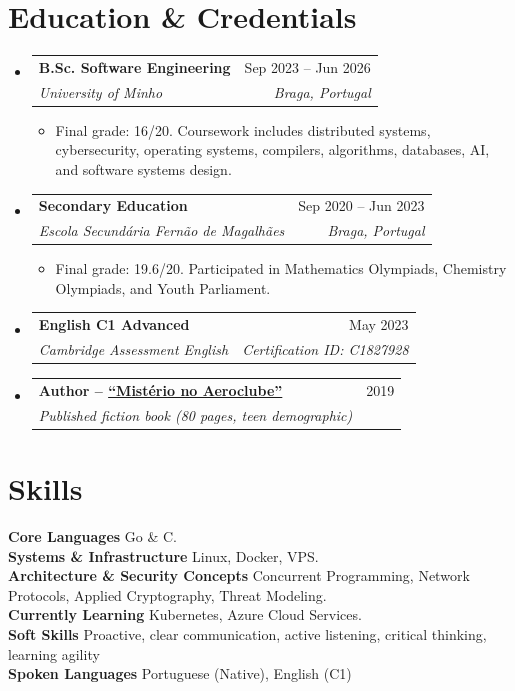 \documentclass[11pt,a4paper]{article}
\makeatletter
\newcommand{\resumeItem}[1]{
	\item\small{#1}
}
\newcommand{\resumeSubheading}[4]{
	\item
		\begin{tabular*}{\textwidth}[t]{l@{\extracolsep{\fill}}r}
			\textbf{#1} & {\small #2} \\
			\textit{\small #3} & \textit{\small #4} \\
		\end{tabular*}\vspace{-0.45em}
}
\newcommand{\resumeSubHeadingListStart}{\begin{itemize}[leftmargin=0pt, label={}, itemsep=0.55em, topsep=0.25em, parsep=0pt, partopsep=0pt]}
\newcommand{\resumeSubHeadingListEnd}{\end{itemize}}
\newcommand{\resumeItemListStart}{\begin{itemize}[leftmargin=1.15em, itemsep=0.16em, topsep=0.28em, parsep=0pt, partopsep=0pt]}
\newcommand{\resumeItemListEnd}{\end{itemize}\vspace{-0.2em}}
\makeatother
\begin{document}
\section{Education \& Credentials}
\resumeSubHeadingListStart
	\resumeSubheading
		{B.Sc. Software Engineering}{Sep 2023 -- Jun 2026}
		{University of Minho}{Braga, Portugal}
		\resumeItemListStart
			\resumeItem{Final grade: 16/20. Coursework includes distributed systems, cybersecurity, operating systems, compilers, algorithms, databases, AI, and software systems design.}
		\resumeItemListEnd

	\resumeSubheading
		{Secondary Education}{Sep 2020 -- Jun 2023}
		{Escola Secundária Fernão de Magalhães}{Braga, Portugal}
		\resumeItemListStart
			\resumeItem{Final grade: 19.6/20. Participated in Mathematics Olympiads, Chemistry Olympiads, and Youth Parliament.}
		\resumeItemListEnd

	\resumeSubheading
		{English C1 Advanced}{May 2023}
		{Cambridge Assessment English}{Certification ID: C1827928}
		{}

	\resumeSubheading
		{Author -- \href{https://marcosevegrand.linkyhost.com}{``Mistério no Aeroclube''}}{2019}
		{Published fiction book (80 pages, teen demographic)}{}
		{}
\resumeSubHeadingListEnd

\section{Skills}
\small
\textbf{Core Languages} \hspace{0.4em} Go \& C. \\[0.15em]
\textbf{Systems \& Infrastructure} \hspace{0.4em} Linux, Docker, VPS. \\[0.15em]
\textbf{Architecture \& Security Concepts} \hspace{0.4em} Concurrent Programming, Network Protocols, Applied Cryptography, Threat Modeling. \\[0.15em]
\textbf{Currently Learning} \hspace{0.4em} Kubernetes, Azure Cloud Services. \\[0.15em]
\textbf{Soft Skills} \hspace{0.4em} Proactive, clear communication, active listening, critical thinking, learning agility \\[0.15em]
\textbf{Spoken Languages} \hspace{0.4em} Portuguese (Native), English (C1)
\end{document}
